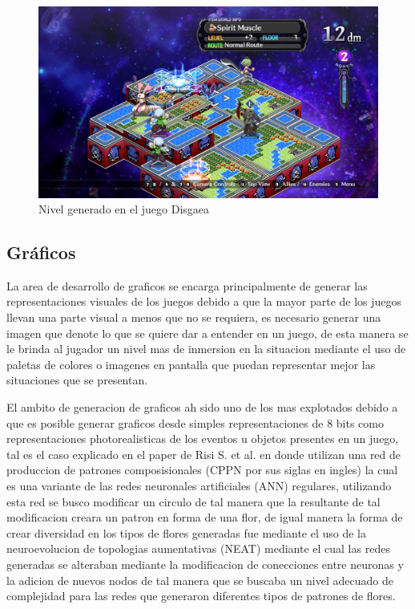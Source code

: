 \begin{figure}
    \centering
    \includegraphics[width=1.0\textwidth]{img/DisgaeaIW.png}
    \caption{Nivel generado en el juego Disgaea}
    \label{figure:DisgaeaIW}
\end{figure}

\subsection{Gráficos}
\label{subsection:Visuals}

La area de desarrollo de graficos se encarga principalmente de generar las
representaciones visuales de los juegos debido a que la mayor parte de los
juegos llevan una parte visual a menos que no se requiera, es necesario generar
una imagen que denote lo que se quiere dar a entender en un juego, de esta
manera se le brinda al jugador un nivel mas de inmersion en la situacion
mediante el uso de paletas de colores o imagenes en pantalla que puedan
representar mejor las situaciones que se presentan.

El ambito de generacion de graficos ah sido uno de los mas explotados debido a
que es posible generar graficos desde simples representaciones de 8 bits como
representaciones photorealisticas de los eventos u objetos presentes en un
juego, tal es el caso explicado en el paper de Risi S. et al.\cite{Risi2012} en
donde utilizan una red de produccion de patrones composisionales (CPPN por sus
siglas en ingles) la cual es una variante de las redes neuronales artificiales
(ANN) regulares, utilizando esta red se busco modificar un circulo de tal manera
que la resultante de tal modificacion creara un patron en forma de una flor, de
igual manera la forma de crear diversidad en los tipos de flores generadas fue
mediante el uso de la neuroevolucion de topologias aumentativas (NEAT) mediante
el cual las redes generadas se alteraban mediante la modificacion de conecciones
entre neuronas y la adicion de nuevos nodos de tal manera que se buscaba un
nivel adecuado de complejidad para las redes que generaron diferentes tipos de
patrones de flores.


